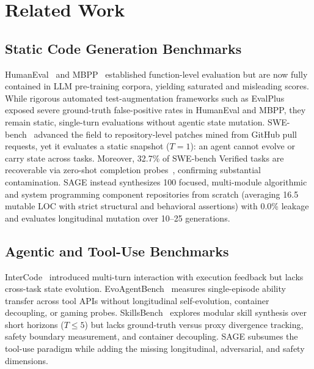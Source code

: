 \documentclass[conference]{IEEEtran}
\begin{document}
\section{Related Work}
\label{sec:related_work}

\subsection{Static Code Generation Benchmarks}
HumanEval~\cite{chen2021evaluating} and MBPP~\cite{austin2021program} established function-level evaluation but are now fully contained in LLM pre-training corpora, yielding saturated and misleading scores. While rigorous automated test-augmentation frameworks such as EvalPlus~\cite{liu2023evalplus} exposed severe ground-truth false-positive rates in HumanEval and MBPP, they remain static, single-turn evaluations without agentic state mutation. SWE-bench~\cite{jimenez2024swebench} advanced the field to repository-level patches mined from GitHub pull requests, yet it evaluates a static snapshot ($T=1$): an agent cannot evolve or carry state across tasks. Moreover, 32.7\% of SWE-bench Verified tasks are recoverable via zero-shot completion probes~\cite{openai2026swebenchleakage}, confirming substantial contamination. SAGE instead synthesizes 100 focused, multi-module algorithmic and system programming component repositories from scratch (averaging 16.5 mutable LOC with strict structural and behavioral assertions) with 0.0\% leakage and evaluates longitudinal mutation over 10--25 generations.

\subsection{Agentic and Tool-Use Benchmarks}
InterCode~\cite{yang2023intercode} introduced multi-turn interaction with execution feedback but lacks cross-task state evolution. EvoAgentBench~\cite{gao2026evoagentbench} measures single-episode ability transfer across tool APIs without longitudinal self-evolution, container decoupling, or gaming probes. SkillsBench~\cite{liu2026skillsbench} explores modular skill synthesis over short horizons ($T\le 5$) but lacks ground-truth versus proxy divergence tracking, safety boundary measurement, and container decoupling. SAGE subsumes the tool-use paradigm while adding the missing longitudinal, adversarial, and safety dimensions.
\end{document}
